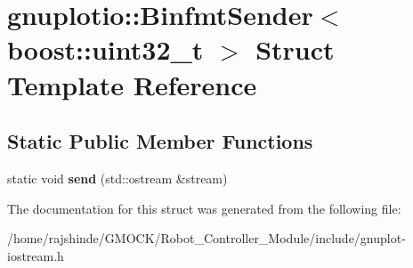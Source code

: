 \hypertarget{structgnuplotio_1_1_binfmt_sender_3_01boost_1_1uint32__t_01_4}{}\section{gnuplotio\+:\+:Binfmt\+Sender$<$ boost\+:\+:uint32\+\_\+t $>$ Struct Template Reference}
\label{structgnuplotio_1_1_binfmt_sender_3_01boost_1_1uint32__t_01_4}
\subsection*{Static Public Member Functions}
\begin{DoxyCompactItemize}
\item 
static void {\bfseries send} (std\+::ostream \&stream)\hypertarget{structgnuplotio_1_1_binfmt_sender_3_01boost_1_1uint32__t_01_4_a134bce57dc5bb3e06c1b369a9826403b}{}\label{structgnuplotio_1_1_binfmt_sender_3_01boost_1_1uint32__t_01_4_a134bce57dc5bb3e06c1b369a9826403b}

\end{DoxyCompactItemize}


The documentation for this struct was generated from the following file\+:\begin{DoxyCompactItemize}
\item 
/home/rajshinde/\+G\+M\+O\+C\+K/\+Robot\+\_\+\+Controller\+\_\+\+Module/include/gnuplot-\/iostream.\+h\end{DoxyCompactItemize}
